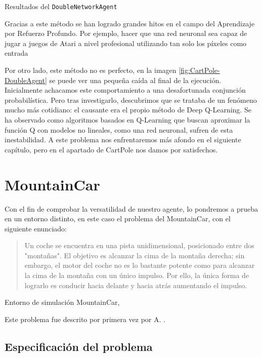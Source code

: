 %
       {Resultados del \texttt{DoubleNetworkAgent}}

Gracias a este método se han logrado grandes hitos en el campo del Aprendizaje por Refuerzo Profundo. Por ejemplo, hacer que una red neuronal sea capaz de jugar a juegos de Atari a nivel profesional utilizando tan solo los píxeles como entrada \citep{mnih2013playing}

Por otro lado, este método no es perfecto, en la imagen \ref{fig:CartPole-DoubleAgent} se puede ver una pequeña caída al final de la ejecución. Inicialmente achacamos este comportamiento a una desafortunada conjunción probabilística. Pero tras investigarlo, descubrimos que se trataba de un fenómeno mucho más cotidiano: el causante era el propio método de Deep Q-Learning. Se ha observado como algoritmos basados en Q-Learning que buscan aproximar la función Q con modelos no lineales, como una red neuronal, sufren de esta inestabilidad. A este problema nos enfrentaremos más afondo en el siguiente capítulo, pero en el apartado de CartPole nos damos por satisfechos. 

\section{MountainCar}

Con el fin de comprobar la versatilidad de nuestro agente, lo pondremos a prueba en un entorno distinto, en este caso el problema del MountainCar, con el siguiente enunciado:

\begin{quote}
    Un coche se encuentra en una pista unidimensional, posicionado entre dos "montañas". El objetivo es alcanzar la cima de la montaña derecha; sin embargo, el motor del coche no es lo bastante potente como para alcanzar la cima de la montaña con un único impulso. Por ello, la única forma de lograrlo es conducir hacia delante y hacia atrás aumentando el impulso.
\end{quote}

%
       {Entorno de simulación MountainCar, \citet{brockman2016openai}}

Este problema fue descrito por primera vez por A. \citet{Moore90efficientmemory-based}.

\subsection{Especificación del problema}

